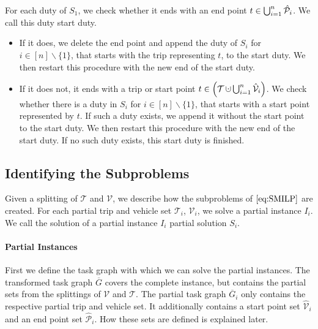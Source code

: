 For each duty of $S_1$, we check whether it ends with an end point $t\in\bigcup_{i=1}^n\hat{\mathcal{P}}_i$. We call this duty start duty.
\begin{itemize}
	\item{If it does, we delete the end point and append the duty of $S_i$ for ${i\in[n]\backslash\{1\}}$, that starts with the trip representing $t$, to the start duty. We then restart this procedure with the new end of the start duty.}
	\item{If it does not, it ends with a trip or start point ${t\in\left(\mathcal{T}\cupdot\bigcup_{i=1}^n\Vhat_i\right)}$. We check whether there is a duty in $S_i$ for ${i\in[n]\backslash\{1\}}$, that starts with a start point represented by $t$. If such a duty exists, we append it without the start point to the start duty. We then restart this procedure with the new end of the start duty. If no such duty exists, this start duty is finished}.
\end{itemize}


\subsection{Identifying the Subproblems}

Given a splitting of $\mathcal{T}$ and $\mathcal{V}$, we describe how the subproblems of $\eqref{eq:SMILP}$ are created. For each partial trip and vehicle set $\mathcal{T}_i$, $\mathcal{V}_i$, we solve a partial instance $I_i$. We call the solution of a partial instance $I_i$ partial solution $S_i$. 

\paragraph{Partial Instances} \parfill

First we define the task graph with which we can solve the partial instances. The transformed task graph $\overline{G}$ covers the complete instance, but contains the partial sets from the splittings of $\mathcal{V}$ and $\mathcal{T}$. The partial task graph $\overline{G}_i$ only contains the respective partial trip and vehicle set. It additionally contains a start point set $\hat{\mathcal{V}}_i$ and an end point set $\hat{\mathcal{P}}_i$. How these sets are defined is explained later.

